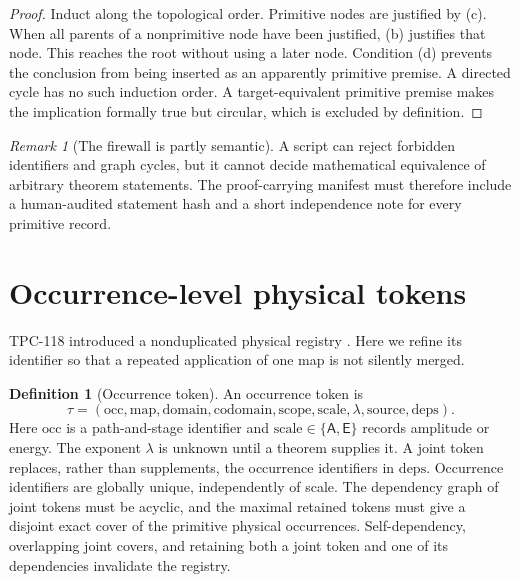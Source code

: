 \documentclass[11pt]{article}
\theoremstyle{definition}
\newtheorem{definition}[theorem]{Definition}
\theoremstyle{remark}
\newtheorem{remark}[theorem]{Remark}
\begin{document}
\begin{proof}
Induct along the topological order.  Primitive nodes are justified by
(c).  When all parents of a nonprimitive node have been justified,
(b) justifies that node.  This reaches the root without using a later
node.  Condition (d) prevents the conclusion from being inserted as
an apparently primitive premise.  A directed cycle has no such
induction order.  A target-equivalent primitive premise makes the
implication formally true but circular, which is excluded by
definition.
\end{proof}

\begin{remark}[The firewall is partly semantic]
A script can reject forbidden identifiers and graph cycles, but it
cannot decide mathematical equivalence of arbitrary theorem
statements.  The proof-carrying manifest must therefore include a
human-audited statement hash and a short independence note for every
primitive record.
\end{remark}

\section{Occurrence-level physical tokens}

TPC-118 introduced a nonduplicated physical registry
\citep{WangTPC118}.  Here we refine its identifier so that a repeated
application of one map is not silently merged.

\begin{definition}[Occurrence token]
\label{def:token}
An occurrence token is
\[
 \tau=(\mathrm{occ},\mathrm{map},\mathrm{domain},\mathrm{codomain},
 \mathrm{scope},\mathrm{scale},\lambda,\mathrm{source},\mathrm{deps}).
\]
Here \(\mathrm{occ}\) is a path-and-stage identifier and
\(\mathrm{scale}\in\{\mathsf A,\mathsf E\}\) records amplitude or
energy.  The exponent \(\lambda\) is unknown until a theorem supplies
it.  A joint token replaces, rather than supplements, the occurrence
identifiers in \(\mathrm{deps}\).  Occurrence identifiers are globally
unique, independently of scale.  The dependency graph of joint tokens
must be acyclic, and the maximal retained tokens must give a disjoint
exact cover of the primitive physical occurrences.  Self-dependency,
overlapping joint covers, and retaining both a joint token and one of
its dependencies invalidate the registry.
\end{definition}
\end{document}
